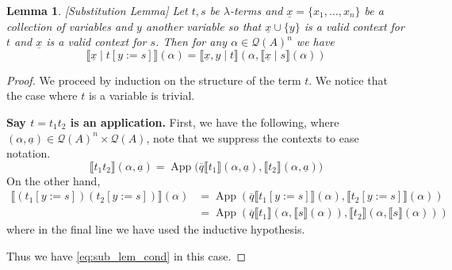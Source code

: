 \documentclass[12pt]{article}
\theoremstyle{plain}
\newtheorem{lemma}[thm]{Lemma}
\theoremstyle{definition}
\newcommand{\call}[1]{\mathcal{#1}}
\newcommand{\Qcal}{\call{Q}}
\begin{document}
	\begin{lemma}\label{lem:substitution}[Substitution Lemma]
		Let $t,s$ be $\lambda$-terms and $\underline{x} = \{ x_1, \ldots, x_{n} \}$ be a collection of variables and $y$ another variable so that $\underline{x} \cup \{ y \}$ is a valid context for $t$ and $\underline{x}$ is a valid context for $s$. Then for any $\alpha\in \Qcal(A)^{n}$ we have
		\begin{equation}\label{eq:sub_lem_cond}
			\llbracket \underline{x} \mid t[y := s]\rrbracket(\alpha) = \llbracket \underline{x}, y \mid t \rrbracket(\alpha, \llbracket \underline{x} \mid s \rrbracket (\alpha))
			\end{equation}
		\end{lemma}
	\begin{proof}
		We proceed by induction on the structure of the term $t$. We notice that the case where $t$ is a variable is trivial.
		
		\textbf{Say $t = t_1t_2$ is an application.} First, we have the following, where $(\alpha, \underline{a}) \in \Qcal(A)^n \times \Qcal(A)$, note that we suppress the contexts to ease notation.
		\begin{equation}
			\llbracket t_1 t_2 \rrbracket(\alpha, \underline{a}) = \operatorname{App}\big(\overline{q}\llbracket t_1 \rrbracket(\alpha, \underline{a}), \llbracket t_2 \rrbracket(\alpha, \underline{a})\big)
			\end{equation}
		On the other hand,
		\begin{align*}
			\llbracket (t_1[y:=s])(t_2[y:=s]) \rrbracket(\alpha) &= \operatorname{App}(\overline{q}\llbracket t_1[y:=s]\rrbracket(\alpha), \llbracket t_2[y:=s]\rrbracket(\alpha))\\
			&= \operatorname{App}(\overline{q}\llbracket t_1 \rrbracket(\alpha, \llbracket s \rrbracket(\alpha)), \llbracket t_2 \rrbracket(\alpha, \llbracket s \rrbracket(\alpha)))
			\end{align*}
		where in the final line we have used the inductive hypothesis.
		
		Thus we have \eqref{eq:sub_lem_cond} in this case.
		

\end{proof}
\end{document}
